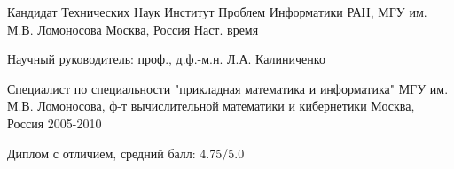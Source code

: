 \begin{cventries}
  \cventry
    {Кандидат Технических Наук}
    {Институт Проблем Информатики РАН, МГУ им. М.В. Ломоносова}
    {Москва, Россия}
    {Наст. время}
    {
      \begin{cvitems}
        \item {Научный руководитель: проф., д.ф.-м.н. Л.А. Калиниченко}
      \end{cvitems}
    }
    \cventry
    {Специалист по специальности  "прикладная математика и информатика"}
    {МГУ им. М.В. Ломоносова, ф-т вычислительной математики и кибернетики}
    {Москва, Россия}
    {2005-2010}
    {
      \begin{cvitems}
        \item {Диплом с отличием, средний балл: 4.75/5.0}
      \end{cvitems}
    }
\end{cventries}
